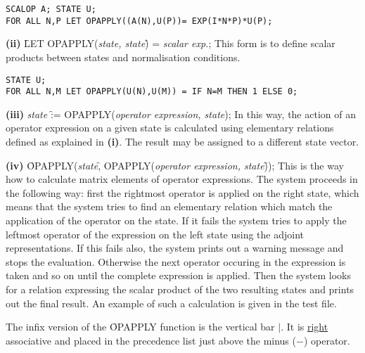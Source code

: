 \begin{verbatim}
SCALOP A; STATE U;
FOR ALL N,P LET OPAPPLY((A(N),U(P))= EXP(I*N*P)*U(P);
\end{verbatim}

{\bf (ii)} \f{LET OPAPPLY(}{\it state, state}\f{) =} {\it scalar exp.};
This form is to define scalar products between states and normalisation
conditions.

\begin{verbatim}
STATE U;
FOR ALL N,M LET OPAPPLY(U(N),U(M)) = IF N=M THEN 1 ELSE 0;
\end{verbatim}

{\bf (iii)} {\it state} \f{:= OPAPPLY(}{\it operator expression, state});
 In this way, the action of an operator expression on a given state
is calculated using elementary relations defined as explained in {\bf
(i)}. The result may be assigned to a different state vector.

{\bf (iv)} \f{OPAPPLY(}{\it state}\f{, OPAPPLY(}{\it operator expression,
state}\f{))}; This is the way how to calculate matrix elements of
operator
expressions. The system proceeds in the following way: first the
rightmost operator is applied on the right state, which means that the
system tries
to find an elementary relation which match the application of the
operator on the state. If it fails
the system tries to apply the leftmost operator of the expression on the
left state using the adjoint representations. If this fails also,
the system prints out a warning message and stops the evaluation.
Otherwise the next operator occuring in the expression is
taken and so on until the complete expression is applied.  Then the
system
looks for a relation expressing the scalar product of the two
resulting states and prints out the final result. An example of such
a calculation is given in the test file.

The infix version of the \f{OPAPPLY} function is the vertical bar
$\mid$. It is \underline{right} associative and placed in the
precedence
list just above the minus ($-$) operator.

